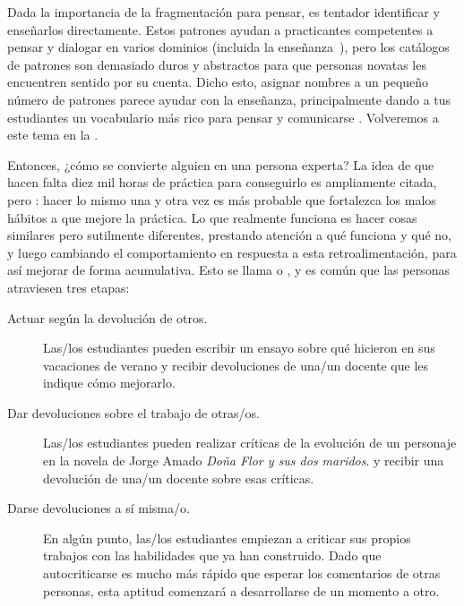 Dada la importancia de la fragmentación para pensar,
es tentador identificar 
y enseñarlos directamente. 
Estos patrones ayudan a practicantes competentes a pensar y dialogar en varios dominios (incluida la enseñanza~\cite{Berg2012}),
pero los catálogos de patrones son demasiado duros y abstractos para que personas novatas les encuentren sentido por su cuenta.
Dicho esto,
asignar nombres a un pequeño número de patrones parece ayudar con la enseñanza,
principalmente dando a tus estudiantes un vocabulario más rico para pensar y comunicarse \cite{Kuit2004,Byck2005,Saja2006}.
Volveremos a este tema en la .


Entonces, ¿cómo se convierte alguien en una persona experta?
La idea de que hacen falta diez mil horas de práctica para conseguirlo es ampliamente citada,
pero :
hacer lo mismo una y otra vez es más probable que fortalezca los malos hábitos a que mejore la práctica.
Lo que realmente funciona es hacer cosas similares pero sutilmente diferentes,
prestando atención a qué funciona y qué no,
y luego cambiando el comportamiento en respuesta a esta retroalimentación, para así mejorar de forma acumulativa.
Esto se llama 
o ,
y es común que las personas atraviesen tres etapas:

\begin{description}

\item[Actuar según la devolución de otros.]
  Las/los estudiantes pueden escribir un ensayo sobre qué hicieron en sus vacaciones de verano
  y recibir devoluciones de una/un docente que les indique cómo mejorarlo.

\item[Dar devoluciones sobre el trabajo de otras/os.]
  Las/los estudiantes pueden realizar críticas de la evolución de un personaje en la novela de Jorge Amado \emph{Doña Flor y sus dos maridos}. 
  y recibir una devolución de una/un docente sobre esas críticas.

\item[Darse devoluciones a sí misma/o.]
  En algún punto,
  las/los estudiantes empiezan a criticar sus propios trabajos
  con las habilidades que ya han construido.
  Dado que auto\-criticarse es mucho más rápido que esperar los comentarios de otras personas, 
  esta aptitud comenzará a desarrollarse de un momento a otro.
  
\end{description}

